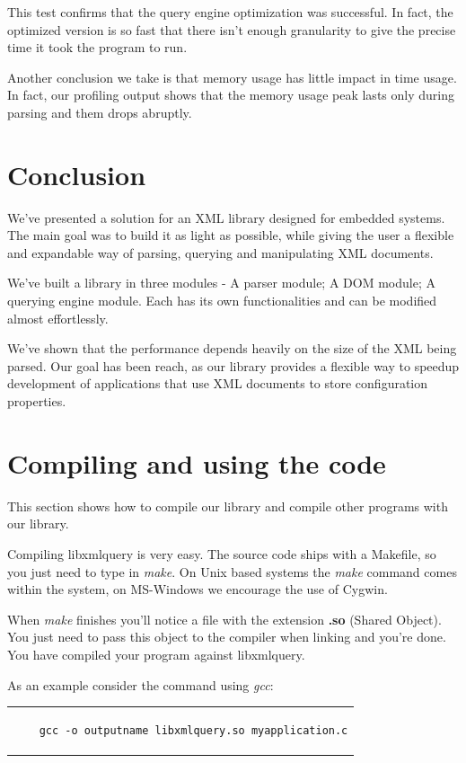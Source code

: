 \documentclass[a4paper]{report}
\begin{document}
	This test confirms that the query engine optimization was successful. In fact, the optimized version is so fast that there isn't enough granularity to give the precise time it took the program to run.
	
	Another conclusion we take is that memory usage has little impact in time usage. In fact, our profiling output shows that the memory usage peak lasts only during parsing and them drops abruptly. 

\chapter{Conclusion} \label{chap:concl}
	We've presented a solution for an XML library designed for embedded systems. The main goal was to build it as light as possible, while giving the user a flexible and expandable way of parsing, querying and manipulating
	XML documents. 
	
	We've built a library in three modules - A parser module; A DOM module; A querying engine module. Each has its own functionalities and can be modified almost effortlessly.
	
	We've shown that the performance depends heavily on the size of the XML being parsed. Our goal has been reach, as our library provides a flexible way to speedup development of applications that use XML documents
	to store configuration properties.
	 

\appendix 
\chapter{Compiling and using the code}\label{chap:gcc}
	This section shows how to compile our library and compile other programs with our library.
	
	Compiling libxmlquery is very easy. The source code ships with a Makefile, so you just need to type in \emph{make}. On Unix based systems the \emph{make} command comes within the system, on MS-Windows we 
	encourage the use of Cygwin.
	
	When \emph{make} finishes you'll notice a file with the extension \textbf{.so} (Shared Object). You just need to pass this object to the compiler when linking and you're done. You have compiled your program against 
	libxmlquery.
	
	As an example consider the command using \emph{gcc}:
	
	\begin{center}
	\lstset{language=bash,caption=Compiling a program against our library, captionpos=b}
	\begin{tabular}{c}
	\begin{lstlisting}
	gcc -o outputname libxmlquery.so myapplication.c
	\end{lstlisting}
	\end{tabular}
	\end{center}
	
\end{document}
